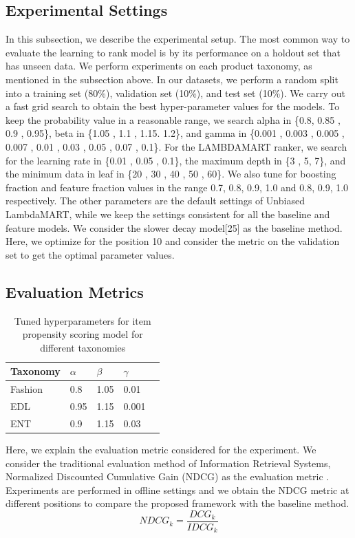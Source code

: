 \documentclass[11pt]{article}
\begin{document}
\subsection{Experimental Settings}
In this subsection, we describe the experimental setup. The most common way to evaluate the learning to rank model is by its performance on a holdout set that has unseen data. We perform experiments on each product taxonomy, as mentioned in the subsection above. In our datasets, we perform a random split into a training set (80\%), validation set (10\%), and test set (10\%). We carry out a fast grid search to obtain the best hyper-parameter values for the models. To keep the probability value in a reasonable range, we search alpha in \{0.8, 0.85 , 0.9 , 0.95\}, beta in \{1.05 , 1.1 , 1.15. 1.2\}, and gamma in \{0.001 , 0.003 , 0.005 , 0.007 , 0.01 , 0.03 , 0.05 , 0.07 , 0.1\}. For the LAMBDAMART ranker, we search for the learning rate in \{0.01 , 0.05 , 0.1\}, the maximum depth in \{3 , 5, 7\}, and the minimum data in leaf in \{20 , 30 , 40 , 50 , 60\}. We also tune for boosting fraction and feature fraction values in the range {0.7, 0.8, 0.9, 1.0} and {0.8, 0.9, 1.0} respectively. The other parameters are the default settings of Unbiased LambdaMART, while we keep the settings consistent for all the baseline and feature models. We consider the slower decay model[25] as the baseline method. Here, we optimize for the position 10 and consider the metric on the validation set to get the optimal parameter values. 

\subsection{Evaluation Metrics}
\begin{table}[b]
\centering
\begin{tabular}{|l|l|l|l|l|}
\hline
Taxonomy & $\alpha$ & $\beta$ & $\gamma$ \\
\hline
Fashion & 0.8 & 1.05 & 0.01 \\ 
\hline
EDL & 0.95 & 1.15 & 0.001 \\ 
\hline
ENT & 0.9 & 1.15 & 0.03\\ 
\hline
\end{tabular}
\caption{Tuned hyperparameters for item propensity scoring model for different taxonomies}
\end{table}

Here, we explain the evaluation metric considered for the experiment. We consider the traditional evaluation method of Information Retrieval Systems, Normalized Discounted Cumulative Gain (NDCG) as the evaluation metric \cite{10.1145/582415.582418, ndcg1, ndcg2}. Experiments are performed in offline settings and we obtain the NDCG metric at different positions to compare the proposed framework with the baseline method.
\begin{equation}
N D C G_k = \frac{D C G_k}{I D C G_k} 
\end{equation}
\end{document}
